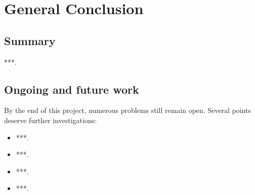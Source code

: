 \chapter*{General Conclusion}
{}

\section*{Summary}
***.

\section*{Ongoing and future work}
By the end of this project, numerous problems still remain open. Several points deserve further investigations:

\begin{itemize}[label = \scriptsize$\blacktriangleright$]
	\item ***.
	\item ***.
	\item ***.
	\item ***.
\end{itemize}